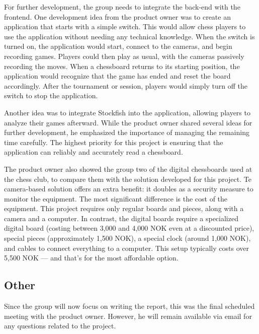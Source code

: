 For further development, the group needs to integrate the back-end with the frontend. One development idea from the product owner was to create an application that starts with a simple switch. This would allow chess players to use the application without needing any technical knowledge. When the switch is turned on, the application would start, connect to the cameras, and begin recording games. Players could then play as usual, with the cameras passively recording the moves. When a chessboard returns to its starting position, the application would recognize that the game has ended and reset the board accordingly. After the tournament or session, players would simply turn off the switch to stop the application.

Another idea was to integrate Stockfish into the application, allowing players to analyze their games afterward. While the product owner shared several ideas for further development, he emphasized the importance of managing the remaining time carefully. The highest priority for this project is ensuring that the application can reliably and accurately read a chessboard.

The product owner also showed the group two of the digital chessboards used at the chess club, to compare them with the solution developed for this project. Te camera-based solution offers an extra benefit: it doubles as a security measure to monitor the equipment. The most significant difference is the cost of the equipment. This project requires only regular boards and pieces, along with a camera and a computer. In contrast, the digital boards require a specialized digital board (costing between 3,000 and 4,000 NOK even at a discounted price), special pieces (approximately 1,500 NOK), a special clock (around 1,000 NOK), and cables to connect everything to a computer. This setup typically costs over 5,500 NOK — and that’s for the most affordable option. 

\subsection{Other} 
Since the group will now focus on writing the report, this was the final scheduled meeting with the product owner. However, he will remain available via email for any questions related to the project.